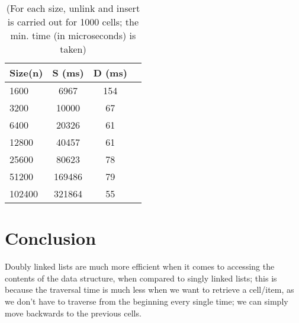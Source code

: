 \documentclass[a4paper,11pt]{article}
\begin{document}
\begin{table}[h]
\begin{center}
\begin{tabular}{l|c|c|c}
\textbf{Size(n)} & \textbf{S (ms)} & \textbf{D (ms)}\\
\hline
  1600      &  6967 &     154\\
  3200      &  10000 &     67\\
  6400      &  20326 &     61\\
  12800      &  40457 &     61\\
  25600      &  80623 &     78\\
  51200      &  169486 &     79\\
  102400      &  321864 &     55\\
\end{tabular}
\caption{(For each size, unlink and insert is carried out for 1000 cells; the min. time (in microseconds) is taken)}
\label{tab:table1}
\end{center}
\end{table}

\section*{Conclusion}

Doubly linked lists are much more efficient when it comes to accessing the contents of the data structure, when compared to singly linked lists; this is because the traversal time is much less when we want to retrieve a cell/item, as we don't have to traverse from the beginning every single time; we can simply move backwards to the previous cells.
\end{document}
